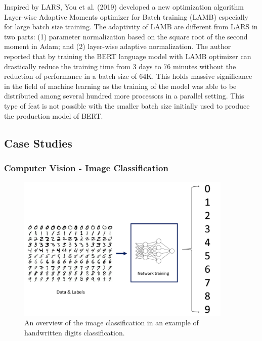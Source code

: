 Inspired by LARS, You et al. (2019) developed a new optimization algorithm Layer-wise Adaptive Moments optimizer for Batch training (LAMB) especially for large batch size training. The adaptivity of LAMB are different from LARS in two parts: (1) parameter normalization based on the square root of the second moment in Adam; and (2) layer-wise adaptive normalization. The author reported that by training the BERT language model with LAMB optimizer can drastically reduce the training time from 3 days to 76 minutes without the reduction of performance in a batch size of 64K. This holds massive significance in the field of machine learning as the training of the model was able to be distributed among several hundred more processors in a parallel setting. This type of feat is not possible with the smaller batch size initially used to produce the production model of BERT.

\subsection{Case Studies}


\subsubsection{Computer Vision - Image Classification}

\begin{figure}[!t]
    \centering
    \includegraphics[width=\linewidth, height=7cm]{img/mnist.png}
    \caption{An overview of the image classification in an example of handwritten digits classification.}
    \label{fig:DrQA_overview}
    \vspace{-10pt}
\end{figure}

